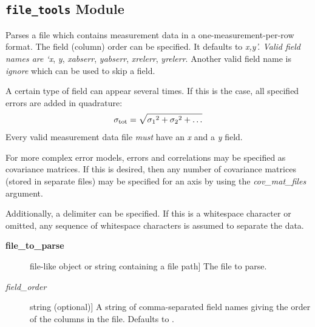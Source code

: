 \documentclass[a4paper,10pt,english]{sphinxmanual}
\begin{document}
\subsection{\texttt{file\_tools} Module}
\label{index:file-tools-module}\label{index:module-kafe.file_tools}\label{index:module-file_tools}

\begin{fulllineitems}
\label{index:kafe.file_tools.parse_column_data}
Parses a file which contains measurement data in a one-measurement-per-row
format. The field (column) order can be specified. It defaults to \emph{x,y'.
Valid field names are {}`x}, \emph{y}, \emph{xabserr}, \emph{yabserr}, \emph{xrelerr},
\emph{yrelerr}. Another valid field name is \emph{ignore} which can be used to skip
a field.

A certain type of field can appear several times. If this is the case, all
specified errors are added in quadrature:
\begin{gather}
\begin{split}\sigma_{\text{tot}} = \sqrt{{\sigma_1}^2+{\sigma_2}^2+\dots}\end{split}\notag
\end{gather}
Every valid measurement data file \emph{must} have an \emph{x} and a \emph{y} field.

For more complex error models, errors and correlations may be specified as
covariance matrices. If this is desired, then any number of covariance
matrices (stored in separate files) may be specified for an axis by
using the \emph{cov\_mat\_files} argument.

Additionally, a delimiter can be specified. If this is a whitespace
character or omitted, any sequence of whitespace characters is assumed to
separate the data.
\begin{description}
\item[{\textbf{file\_to\_parse}}] \leavevmode{[}file-like object or string containing a file path{]}
The file to parse.

\item[{\emph{field\_order}}] \leavevmode{[}string (optional){]}
A string of comma-separated field names giving the order of the columns
in the file. Defaults to .


\end{description}
\end{fulllineitems}
\end{document}
